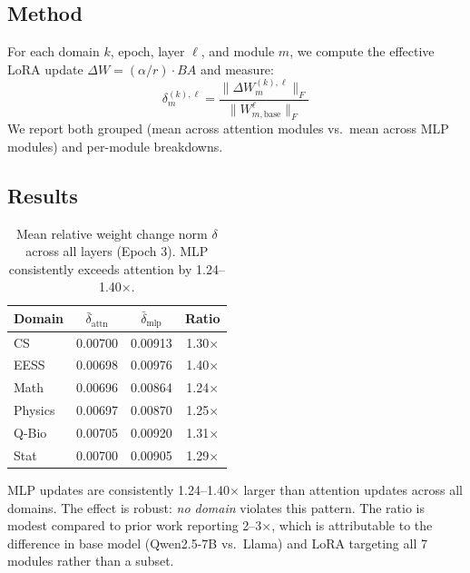 \documentclass[11pt,a4paper]{article}
\begin{document}
\subsection{Method}
For each domain $k$, epoch, layer $\ell$, and module $m$, we compute the effective LoRA update $\Delta W = (\alpha/r) \cdot B A$ and measure:
\[
\delta^{(k),\ell}_m = \frac{\|\Delta W^{(k),\ell}_m\|_F}{\|W^{\ell}_{m,\text{base}}\|_F}
\]
We report both grouped (mean across attention modules vs.\ mean across MLP modules) and per-module breakdowns.

\subsection{Results}

\begin{table}[H]
\centering
\caption{Mean relative weight change norm $\delta$ across all layers (Epoch 3). MLP consistently exceeds attention by 1.24--1.40$\times$.}
\label{tab:wcn}
\small
\begin{tabular}{lccc}
\toprule
Domain & $\bar{\delta}_{\text{attn}}$ & $\bar{\delta}_{\text{mlp}}$ & Ratio \\
\midrule
CS      & 0.00700 & 0.00913 & 1.30$\times$ \\
EESS    & 0.00698 & 0.00976 & 1.40$\times$ \\
Math    & 0.00696 & 0.00864 & 1.24$\times$ \\
Physics & 0.00697 & 0.00870 & 1.25$\times$ \\
Q-Bio   & 0.00705 & 0.00920 & 1.31$\times$ \\
Stat    & 0.00700 & 0.00905 & 1.29$\times$ \\
\bottomrule
\end{tabular}
\end{table}

MLP updates are consistently 1.24--1.40$\times$ larger than attention updates across all domains. The effect is robust: \emph{no domain} violates this pattern. The ratio is modest compared to prior work reporting 2--3$\times$, which is attributable to the difference in base model (Qwen2.5-7B vs.\ Llama) and LoRA targeting all 7 modules rather than a subset.
\end{document}
